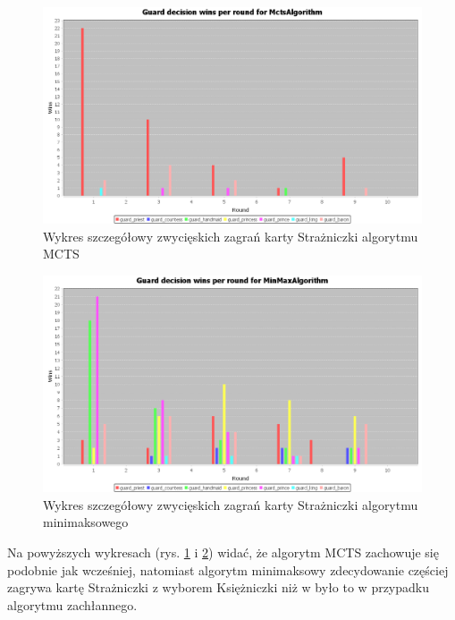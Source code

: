 \begin{figure}[H]
	\centering
	\includegraphics[width=\textwidth]{Resources/MirrorMmVsMcts/MctsVsMmGuardDecision.PNG}
	\caption{Wykres szczegółowy zwycięskich zagrań karty Strażniczki algorytmu MCTS} 
	\label{fig:MctsVsMmGuardDecision}
\end{figure}

\begin{figure}[H]
	\centering
	\includegraphics[width=\textwidth]{Resources/MirrorMmVsMcts/MmVsMctsGuardDecision.PNG}
	\caption{Wykres szczegółowy zwycięskich zagrań karty Strażniczki algorytmu minimaksowego} 
	\label{fig:MmVsMctsGuardDecision}
\end{figure}

Na powyższych wykresach (rys. \ref{fig:MctsVsMmGuardDecision} i \ref{fig:MmVsMctsGuardDecision}) widać, że algorytm MCTS zachowuje się podobnie jak wcześniej, natomiast algorytm minimaksowy zdecydowanie częściej zagrywa kartę Strażniczki z wyborem Księżniczki niż w było to w przypadku algorytmu zachłannego.

